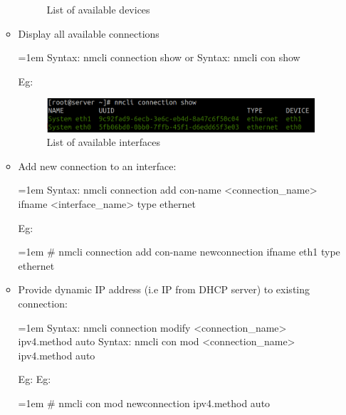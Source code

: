 \begin{flushleft}
\begin{itemize}
\begin{itemize}
\begin{figure}[h!]
			\caption{List of available devices}
			\label{fig:devices}
		\end{figure}		
		\newpage
		\item Display all available connections
		\begin{tcolorbox}[breakable,notitle,boxrule=-0pt,colback=pink,colframe=pink]
			\color{black}
			\font=1em
			Syntax: nmcli connection show
			\newline
			or
			\newline
			Syntax: nmcli con show
			\font=4pt
		\end{tcolorbox}
		Eg:
		\begin{figure}[h!]
			\centering
			\includegraphics[scale=.35]{content/chapter14/images/show.png}
			\caption{List of available interfaces}
			\label{fig:list}
		\end{figure}		
	
		\bigskip
		\bigskip
		\item Add new connection to an interface:
		\begin{tcolorbox}[breakable,notitle,boxrule=-0pt,colback=pink,colframe=pink]
			\color{black}
			\font=1em
			Syntax: nmcli connection add con-name <connection\_name> ifname <interface\_name> type ethernet
			\font=4pt
		\end{tcolorbox}

		Eg:	
		\begin{tcolorbox}[breakable,notitle,boxrule=-0pt,colback=black,colframe=black]
			\color{green}
			\font=1em
			\# nmcli connection add con-name newconnection ifname eth1 type ethernet
			\font=4pt
		\end{tcolorbox}

		\bigskip
		\bigskip
		\item Provide dynamic IP address (i.e IP from DHCP server) to existing connection:
		\begin{tcolorbox}[breakable,notitle,boxrule=-0pt,colback=pink,colframe=pink]
			\color{black}
			\font=1em
			Syntax: nmcli connection modify <connection\_name> ipv4.method auto
			\newline
			\newline
			Syntax: nmcli con mod <connection\_name> ipv4.method auto
			\font=4pt
		\end{tcolorbox}
		Eg:
		Eg:	
		\begin{tcolorbox}[breakable,notitle,boxrule=-0pt,colback=black,colframe=black]
			\color{green}
			\font=1em
			\# nmcli con mod newconnection ipv4.method auto
			\font=4pt
		\end{tcolorbox}
		


\end{itemize}
\end{itemize}
\end{flushleft}
